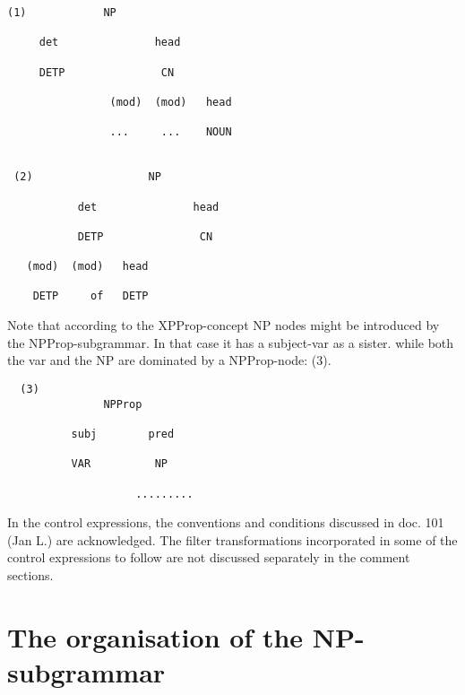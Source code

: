 \begin{verbatim}
(1)            NP

     det               head

     DETP               CN

                (mod)  (mod)   head

                ...     ...    NOUN 


 (2)                  NP

           det               head

           DETP               CN

   (mod)  (mod)   head

    DETP     of   DETP

\end{verbatim}
Note that according to the XPProp-concept NP nodes might be introduced by the
NPProp-subgrammar. In that case it has a subject-var as a sister. while both
the var and the NP are dominated by a NPProp-node: (3). 

\begin{verbatim}
  (3)
               NPProp

          subj        pred

          VAR          NP

                    .........

\end{verbatim}
In the control expressions, the conventions and conditions discussed in doc.
101 (Jan L.) are acknowledged. The filter transformations incorporated in some
of the control expressions to follow are not discussed separately in the
comment sections.

\section{The organisation of the NP-subgrammar}
